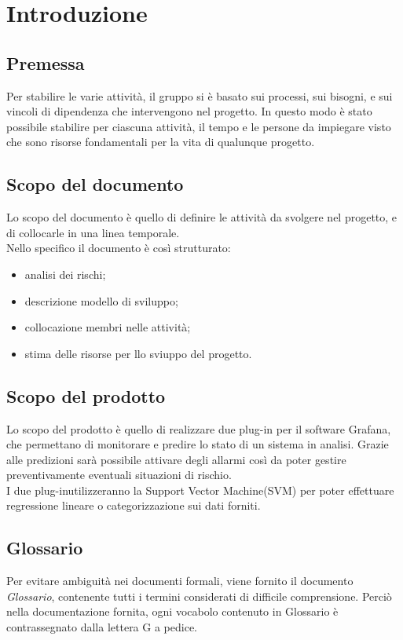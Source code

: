 \section{Introduzione}

\subsection{Premessa}
Per stabilire le varie attività, il gruppo si è basato sui processi, sui bisogni, e sui vincoli di dipendenza che intervengono nel progetto. In questo modo è stato possibile stabilire per ciascuna attività, il tempo e le persone da impiegare visto che sono risorse fondamentali per la vita di qualunque progetto.

\subsection{Scopo del documento}
Lo scopo del documento è quello di definire le attività da svolgere nel progetto, e di collocarle in una linea temporale.\\
Nello specifico il documento è così strutturato:
\begin{itemize}
\item analisi dei rischi;
\item descrizione modello di sviluppo;
\item collocazione membri nelle attività;
\item stima delle risorse per llo sviuppo del progetto.
\end{itemize}
\subsection{Scopo del prodotto}
Lo scopo del prodotto è quello di realizzare due plug-in per il software Grafana\glo, che permettano di monitorare e predire lo stato di un sistema in analisi. Grazie alle predizioni sarà possibile attivare degli allarmi così da poter gestire preventivamente eventuali situazioni di rischio. \\
I due plug-in\glo utilizzeranno la Support Vector Machine\glo (SVM) per poter effettuare regressione lineare o categorizzazione sui dati forniti.
\begin{comment}
I due plug-in\glo utilizzeranno la Support Vector Machine\glo (SVM) o la Regressione Lineare per classificazione o regressione sui dati forniti.
\end{comment}

\subsection{Glossario}
Per evitare ambiguità nei documenti formali, viene fornito il documento \textit{Glossario}, contenente tutti i termini considerati di difficile comprensione. Perciò nella documentazione fornita, ogni vocabolo contenuto in Glossario è contrassegnato dalla lettera G a pedice.

